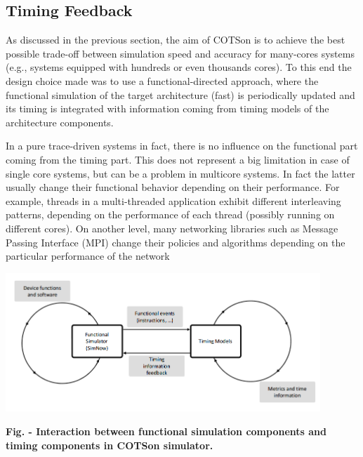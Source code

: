 \documentclass[a4paper]{article}
\newcounter{Figure}
\renewcommand\theFigure{\arabic{Figure}}
\begin{document}
\subsection[Timing Feedback]{Timing Feedback}
{
As discussed in the previous section, the aim of COTSon is to achieve
the best possible trade-off between simulation speed and accuracy for
many-cores systems (e.g., systems equipped with hundreds or even
thousands cores). To this end the design choice made was to use a
functional-directed approach, where the functional simulation of the
target architecture (fast) is periodically updated and its timing is
integrated with information coming from timing models of the
architecture components. }

{
In a pure trace-driven systems in fact, there is no influence on the
functional part coming from the timing part. This does not represent a
big limitation in case of single core systems, but can be a problem in
multicore systems. In fact the latter usually change their functional
behavior depending on their performance. For example, threads in a
multi-threaded application exhibit different interleaving patterns,
depending on the performance of each thread (possibly running on
different cores). On another level, many networking libraries such as
Message Passing Interface (MPI) change their policies and algorithms
depending on the particular performance of the network }

{\centering 
\includegraphics[width=4.6654in,height=2.0646in]{img2.png}
\par}

{\centering{}\sffamily\bfseries
Fig.
\stepcounter{Figure}{\theFigure} - Interaction between functional
simulation components and timing components in COTSon simulator.
\par}
\end{document}
